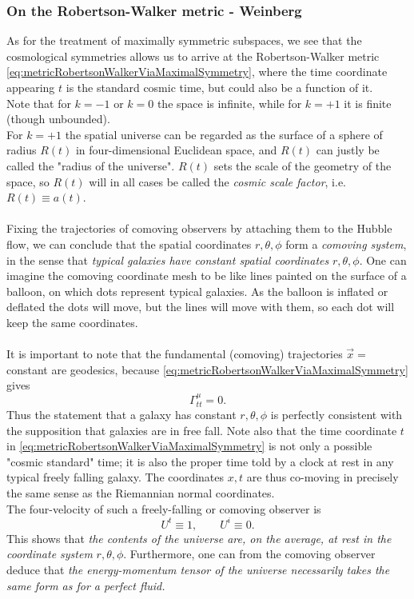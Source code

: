 	\subsubsection{On the Robertson-Walker metric - Weinberg}
	As for the treatment of maximally symmetric subspaces, we see that the cosmological symmetries allows us to arrive at the Robertson-Walker metric \ref{eq:metricRobertsonWalkerViaMaximalSymmetry}, where the time coordinate appearing $t$ is the standard cosmic time, but could also be a function of it.\\
	Note that for $k=-1$ or $k=0$ the space is infinite, while for $k=+1$ it is finite (though unbounded).\\
	For $k=+1$ the spatial universe can be regarded as the surface of a sphere of radius $R(t)$ in four-dimensional Euclidean space, and $R(t)$ can justly be called the "radius of the universe". $R(t)$ sets the scale of the geometry of the space, so $R(t)$ will in all cases be called the \emph{cosmic scale factor}, i.e. $R(t)\equiv a(t)$.
	\\
	\\
	Fixing the trajectories of comoving observers by attaching them to the Hubble flow, we can conclude that the spatial coordinates $r,\theta,\phi$ form a \emph{comoving system}, in the sense that \emph{typical galaxies have constant spatial coordinates} $r,\theta,\phi$. One can imagine the comoving coordinate mesh to be like lines painted on the surface of a balloon, on which dots represent typical galaxies. As the balloon is inflated or deflated the dots will move, but the lines will move with them, so each dot will keep the same coordinates.\\
	\\
	It is important to note that the fundamental (comoving) trajectories $\vec{x}=$constant are geodesics, because \ref{eq:metricRobertsonWalkerViaMaximalSymmetry} gives
	\begin{equation}
		\Gamma^\mu_{tt} = 0.
	\end{equation}
	Thus the statement that a galaxy has constant $r,\theta,\phi$ is perfectly consistent with the supposition that galaxies are in free fall. Note also that the time coordinate $t$ in \ref{eq:metricRobertsonWalkerViaMaximalSymmetry} is not only a possible "cosmic standard" time; it is also the proper time told by a clock at rest in any typical freely falling galaxy. The coordinates $x,t$ are thus co-moving in precisely the same sense as the Riemannian normal coordinates.\\
	The four-velocity of such a freely-falling or comoving observer is
	\begin{equation}
		U^t\equiv 1, \qquad U^i \equiv 0.
	\end{equation}
	This shows that \emph{the contents of the universe are, on the average, at rest in the coordinate system} $r,\theta,\phi$. Furthermore, one can from the comoving observer deduce that \emph{the energy-momentum tensor of the universe necessarily takes the same form as for a perfect fluid.}
	
